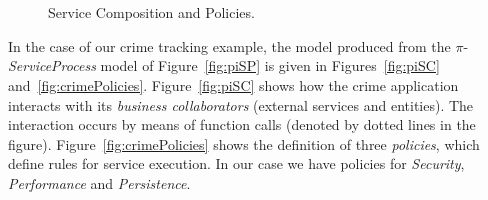 \documentclass{llncs}
\theoremstyle{plain}
\theoremstyle{plain}
\theoremstyle{plain}
\begin{document}
\begin{figure}[t]
\centering
{}
~ %
\\[-1mm]
~ %
\caption{Service Composition and Policies.}
\label{fig:policies}
\end{figure}

In the case of our crime tracking example, the model produced from the $\pi$-\textit{ServiceProcess} model of Figure~\ref{fig:piSP} is given in Figures~\ref{fig:piSC} and~\ref{fig:crimePolicies}.
Figure~\ref{fig:piSC} shows how the crime application interacts with its \textit{business collaborators} (external services and entities).
The interaction occurs by means of function calls (denoted by dotted lines in the figure).
Figure~\ref{fig:crimePolicies} shows the definition of three \textit{policies}, which define rules for service execution.
In our case we have policies for \textit{Security}, \textit{Performance} and \textit{Persistence}. 
\end{document}
